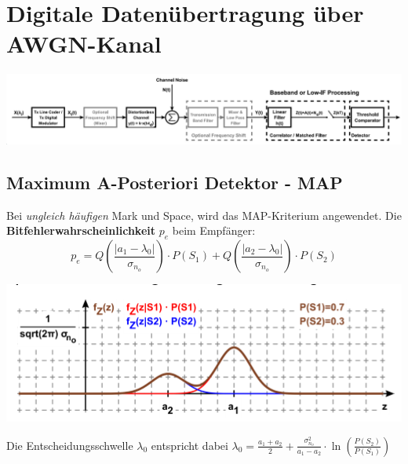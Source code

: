 \section{Digitale Datenübertragung über AWGN-Kanal}
\begin{center}
	\includegraphics[width=\columnwidth]{Images/awgn_digital}
\end{center}

\subsection{Maximum A-Posteriori Detektor - MAP}
 Bei \textit{ungleich häufigen} Mark und Space, wird das MAP-Kriterium angewendet. Die \textbf{Bitfehlerwahrscheinlichkeit} $p_e$ beim Empfänger:
\[
p_e = Q\left(\frac{|a_1 - \lambda_0|}{\sigma_{n_o}}\right)\cdot P(S_1) + Q\left(\frac{|a_2 - \lambda_0|}{\sigma_{n_o}}\right)\cdot P(S_2)
\]
\begin{center}
	\includegraphics[width=0.8\columnwidth]{Images/map}
\end{center}
Die Entscheidungsschwelle $\lambda_0$ entspricht dabei $\lambda_0 = \frac{a_1 + a_2}{2} + \frac{\sigma_{n_o}^2}{a_1 - a_2}\cdot\ln\left(\frac{P(S_2)}{P(S_1)}\right)$


